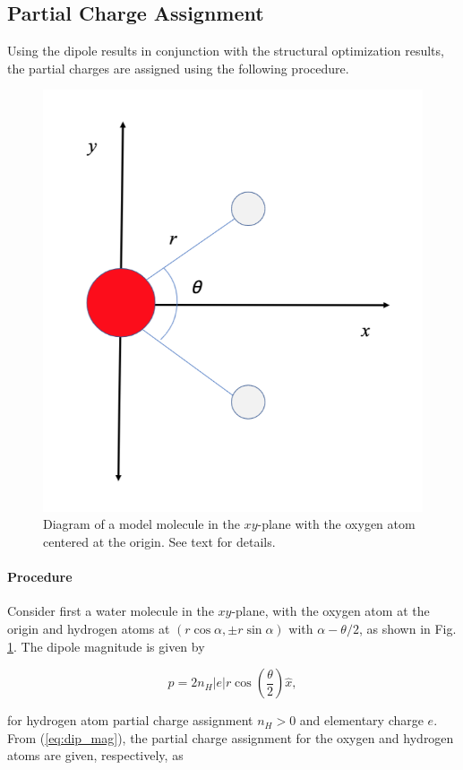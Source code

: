             \subsection{Partial Charge Assignment}
            \label{sec:pc_assign}
            
            Using the dipole results in conjunction with the structural optimization results, the partial charges are assigned using the following procedure.
            
            \begin{figure}
                \centering
                \includegraphics[width=0.5\linewidth]{Figures/System/pc_analysis.png}
                \caption{Diagram of a model molecule in the $xy$-plane with the oxygen atom centered at the origin. See text for details.}
                \label{fig:pc_analysis}
            \end{figure}
            
            \paragraph{Procedure} Consider first a water molecule in the $xy$-plane, with the oxygen atom at the origin and hydrogen atoms at $(r\cos\alpha,\pm r\sin\alpha)$ with $\alpha - \theta/2$, as shown in Fig. \ref{fig:pc_analysis}. The dipole magnitude is given by
            
            \begin{equation}
            \label{eq:dip_mag}
                p = 2n_H|e| r \cos\left(\frac{\theta}{2} \right)\hat{x},
            \end{equation}

        \noindent for hydrogen atom partial charge assignment $n_H > 0$ and elementary charge $e$. From (\ref{eq:dip_mag}), the partial charge assignment for the oxygen and hydrogen atoms are given, respectively, as
        
